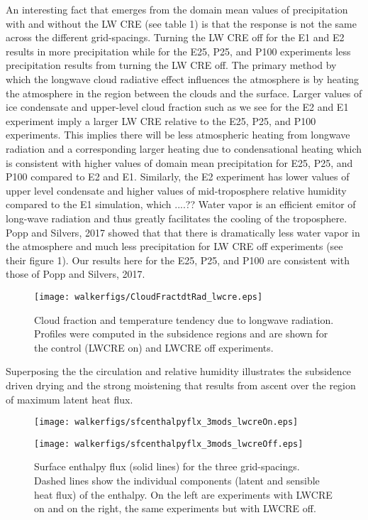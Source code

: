 \documentclass[11pt]{article}   	%
\begin{document}
An interesting fact that emerges from the domain mean values of precipitation with and without the LW CRE (see table 1) 
is that the response is not the same across the different grid-spacings.  
Turning the LW CRE off for the E1 and E2 results in more precipitation while for the E25, P25, and P100 experiments 
less precipitation results from turning the LW CRE off.  The primary method by which the longwave cloud radiative effect 
influences the atmosphere is by heating the atmosphere in the region between the clouds and the surface.  Larger values 
of ice condensate and upper-level cloud fraction such as we see for the E2 and E1 experiment imply a larger LW CRE relative
to the E25, P25, and P100 experiments.    
This implies there will be less atmospheric heating from 
longwave radiation and a corresponding larger heating due to condensational heating which is consistent with higher values 
of domain mean precipitation for E25, P25, and P100 compared to E2 and E1.  Similarly, the E2 experiment has lower values 
of upper level condensate and higher values of mid-troposphere relative humidity compared to the E1 simulation, which ....??  
Water vapor is an efficient emitor of long-wave radiation and thus greatly facilitates the cooling of the troposphere.  
Popp and Silvers, 2017 showed that that there is dramatically less water vapor in the atmosphere and much less precipitation 
for LW CRE off experiments (see their figure 1).  Our results here for the E25, P25, and P100 are consistent with 
those of Popp and Silvers, 2017.  


\begin{figure}
  \centering
      \texttt{[image: walkerfigs/CloudFractdtRad\_lwcre.eps]}
  \caption{Cloud fraction and temperature tendency due to longwave radiation.  Profiles were computed in the 
  subsidence regions and are shown for the control (LWCRE on) and LWCRE off experiments.}
  \label{fig:cf_tdtlw}
\end{figure}


  
Superposing the the circulation and relative humidity illustrates the subsidence driven 
drying and the strong moistening that results from ascent over the region of maximum latent heat flux.  

\begin{figure}
  \centering
  \begin{minipage}{0.4\textwidth}
    \centering
      \texttt{[image: walkerfigs/sfcenthalpyflx\_3mods\_lwcreOn.eps]} 
    \end{minipage}
    \begin{minipage}{0.4\textwidth}
    \centering
      \texttt{[image: walkerfigs/sfcenthalpyflx\_3mods\_lwcreOff.eps]}
    \end{minipage}
    \caption{Surface enthalpy flux (solid lines) for the three grid-spacings.  Dashed lines show the individual components 
    (latent and sensible heat flux) of the enthalpy.
    On the left are experiments with LWCRE on and on the right, the same experiments but with LWCRE off.}
    \label{fig:enthalpy}
\end{figure}
\end{document}
